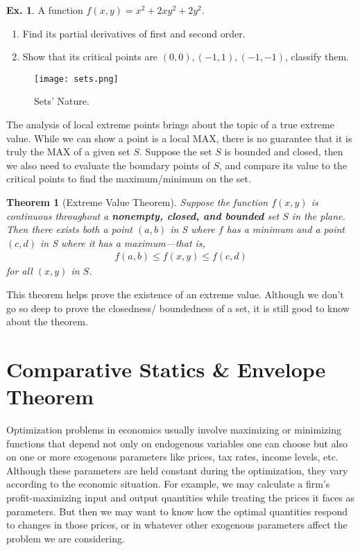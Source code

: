 \documentclass[10pt,a4paper]{book}
\newtheorem{theorem}{Theorem}[section]
\theoremstyle{definition}\newtheorem{definition}{Definition}
\theoremstyle{definition}\newtheorem{fact}{Fact}
\theoremstyle{definition}\newtheorem{ex}{Ex.}
\theoremstyle{definition}\newtheorem{project}{Project}
\theoremstyle{definition}\newtheorem{problem}{Problem}
\theoremstyle{definition}\newtheorem{example}{Example}
\numberwithin{theorem}{chapter}
\numberwithin{corollary}{chapter}
\numberwithin{assumption}{chapter}
\numberwithin{definition}{chapter}
\numberwithin{prop}{chapter}
\numberwithin{notation}{chapter}
\numberwithin{problem}{chapter}
\numberwithin{example}{chapter}
\numberwithin{fact}{chapter}
\numberwithin{ex}{chapter}
\newenvironment{ftheorem}
{\begin{mdframed}\begin{theorem}}
		{\end{theorem}\end{mdframed}}
\begin{document}
	\begin{ex}
		A function $f(x,y) = x^2 + 2xy^2 + 2y^2$.
		\begin{enumerate}
			\item Find its partial derivatives of first and second order.
			\item Show that its critical points are $(0,0), (-1,1), (-1,-1)$, classify them.
		\end{enumerate}
	\end{ex}
	
	
	\begin{figure}[ht]
		\centering
		\texttt{[image: sets.png]}
		\caption{Sets' Nature.}
	\end{figure}
	
	The analysis of local extreme points brings about the topic of a true extreme value. While we can show a point is a local MAX, there is no guarantee that it is truly the MAX of a given set $S$. Suppose the set $S$ is bounded and closed, then we also need to evaluate the boundary points of $S$, and compare its value to the critical points to find the maximum/minimum on the set.
	
	\begin{ftheorem}[Extreme Value Theorem]
		Suppose the function $f (x, y)$ is continuous throughout a \textbf{nonempty, closed, and bounded} set $S$ in the plane. Then there exists both a point $(a, b)$ in S where $f$ has a minimum and a point $(c, d)$ in S where it has a maximum—that is,
		\begin{align}
			f(a,b) \leq f(x,y) \leq f(c,d) 
		\end{align}
		for all $(x, y)$ in $S$.
	\end{ftheorem}
	
	This theorem helps prove the existence of an extreme value. Although we don't go so deep to prove the closedness/ boundedness of a set, it is still good to know about the theorem.
	
	\section{Comparative Statics \& Envelope Theorem}
	Optimization problems in economics usually involve maximizing or minimizing functions that depend not only on endogenous variables one can choose but also on one or more exogenous parameters like prices, tax rates, income levels, etc. Although these parameters are held constant during the optimization, they vary according to the economic situation. For example, we may calculate a firm’s profit-maximizing input and output quantities while treating the prices it faces as parameters. But then we may want to know how the optimal quantities respond to changes in those prices, or in whatever other exogenous parameters affect the problem we are considering.
	
\end{document}
